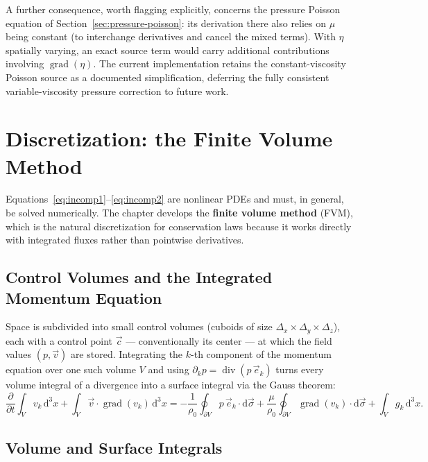 \documentclass[11pt]{article}
\newcommand{\vv}{\vec{v}}
\begin{document}
A further consequence, worth flagging explicitly, concerns the pressure Poisson equation of Section~\ref{sec:pressure-poisson}: its derivation there also relies on $\mu$ being constant (to interchange derivatives and cancel the mixed terms). With $\eta$ spatially varying, an exact source term would carry additional contributions involving $\operatorname{grad}(\eta)$. The current implementation retains the constant-viscosity Poisson source as a documented simplification, deferring the fully consistent variable-viscosity pressure correction to future work.

\section{Discretization: the Finite Volume Method}

Equations~\eqref{eq:incomp1}--\eqref{eq:incomp2} are nonlinear PDEs and must, in general, be solved numerically. The chapter develops the \textbf{finite volume method} (FVM), which is the natural discretization for conservation laws because it works directly with integrated fluxes rather than pointwise derivatives.

\subsection{Control Volumes and the Integrated Momentum Equation}

Space is subdivided into small control volumes (cuboids of size $\Delta_x\times\Delta_y\times\Delta_z$), each with a control point $\vec c$ — conventionally its center — at which the field values $(p,\vv)$ are stored. Integrating the $k$-th component of the momentum equation over one such volume $V$ and using $\partial_k p = \operatorname{div}(p\,\vec e_k)$ turns every volume integral of a divergence into a surface integral via the Gauss theorem:
\begin{equation}
  \frac{\partial}{\partial t}\int_V v_k\,\mathrm{d}^3x + \int_V \vv\cdot\operatorname{grad}(v_k)\,\mathrm{d}^3x
  = -\frac{1}{\rho_0}\oint_{\partial V} p\,\vec e_k\cdot\mathrm{d}\vec\sigma + \frac{\mu}{\rho_0}\oint_{\partial V}\operatorname{grad}(v_k)\cdot\mathrm{d}\vec\sigma + \int_V g_k\,\mathrm{d}^3x.
\end{equation}

\subsection{Volume and Surface Integrals}
\end{document}
